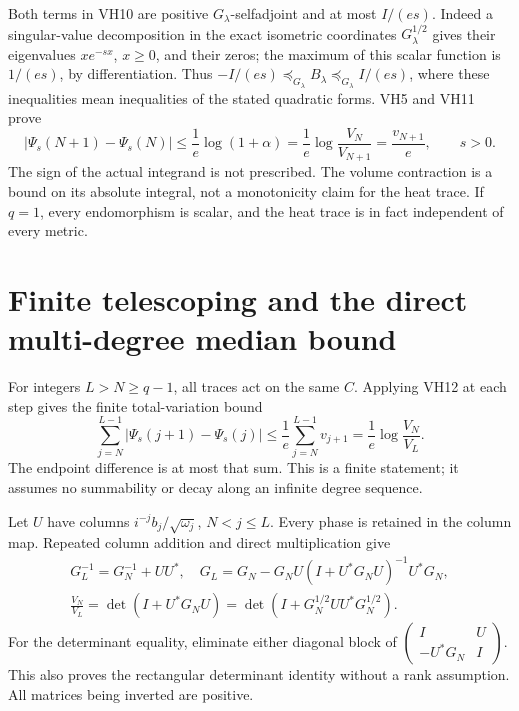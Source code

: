 \documentclass[11pt]{article}
\begin{document}
Both terms in VH10 are positive \(G_\lambda\)-selfadjoint and at most
\(I/(es)\). Indeed a singular-value decomposition in the exact
isometric coordinates \(G_\lambda^{1/2}\) gives their eigenvalues
\(x e^{-sx}\), \(x\ge0\), and their zeros; the maximum of this scalar
function is \(1/(es)\), by differentiation. Thus
\(-I/(es)\preceq_{G_\lambda}B_\lambda\preceq_{G_\lambda}I/(es)\),
where these inequalities mean inequalities of the stated quadratic forms.
VH5 and VH11 prove
\begin{equation}\tag{VH12}\label{VH12}
\boxed{\quad
|\Psi_s(N+1)-\Psi_s(N)|
\le\frac1e\log(1+\alpha)
=\frac1e\log\frac{V_N}{V_{N+1}}
=\frac{v_{N+1}}e,\qquad s>0.\quad}
\end{equation}
The sign of the actual integrand is not prescribed. The volume
contraction is a bound on its absolute integral, not a monotonicity
claim for the heat trace. If \(q=1\), every endomorphism is scalar,
and the heat trace is in fact independent of every metric.

\section{Finite telescoping and the direct multi-degree median bound}

For integers \(L>N\ge q-1\), all traces act on the same \(C\).
Applying VH12 at each step gives the finite total-variation bound
\begin{equation}\tag{VH13}\label{VH13}
\sum_{j=N}^{L-1}|\Psi_s(j+1)-\Psi_s(j)|
\le\frac1e\sum_{j=N}^{L-1}v_{j+1}
=\frac1e\log\frac{V_N}{V_L}.
\end{equation}
The endpoint difference is at most that sum. This is a finite statement;
it assumes no summability or decay along an infinite degree sequence.

Let \(U\) have columns \(i^{-j}b_j/\sqrt{\omega_j}\), \(N<j\le L\).
Every phase is retained in the column map. Repeated column addition
and direct multiplication give
\begin{equation}\tag{VH14}\label{VH14}
\begin{gathered}
G_L^{-1}=G_N^{-1}+UU^*,\quad
G_L=G_N-G_NU(I+U^*G_NU)^{-1}U^*G_N,\\
\frac{V_N}{V_L}=\det(I+U^*G_NU)
=\det(I+G_N^{1/2}UU^*G_N^{1/2}).
\end{gathered}
\end{equation}
For the determinant equality, eliminate either diagonal block of
\(\left(\begin{smallmatrix}I&U\\-U^*G_N&I\end{smallmatrix}\right)\).
This also proves the rectangular determinant identity without a rank
assumption. All matrices being inverted are positive.
\end{document}
